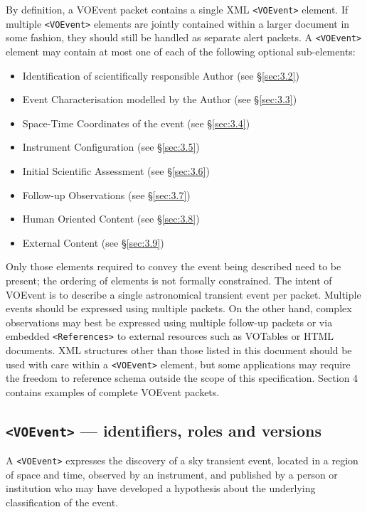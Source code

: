 \documentclass[11pt,a4paper]{ivoa}
\begin{document}
By definition, a VOEvent packet contains a single XML \verb|<VOEvent>| element.
If multiple \verb|<VOEvent>| elements are jointly contained within a larger
document in some fashion, they should still be handled as separate alert
packets. A \verb|<VOEvent>| element may contain at most one of each of the
following optional sub-elements:
\begin{itemize}
\item[\tt <Who>] Identification of scientifically responsible Author (see
\S\ref{sec:3.2})
\item[\tt <What>] Event Characterisation modelled by the Author (see
\S\ref{sec:3.3})
\item[\tt <WhereWhen>] Space-Time Coordinates of the event (see \S\ref{sec:3.4})
\item[\tt <How>] Instrument Configuration (see \S\ref{sec:3.5})
\item[\tt <Why>] Initial Scientific Assessment (see \S\ref{sec:3.6})
\item[\tt <Citations>] Follow-up Observations (see \S\ref{sec:3.7})
\item[\tt <Description>] Human Oriented Content (see \S\ref{sec:3.8})
\item[\tt <Reference>] External Content (see \S\ref{sec:3.9})
\end{itemize}

Only those elements required to convey the event being described need to be
present; the ordering of elements is not formally constrained. The intent of
VOEvent is to describe a single astronomical transient event per packet.
Multiple events should be expressed using multiple packets. On the other hand,
complex observations may best be expressed using multiple follow-up packets or
via embedded \verb|<References>| to external resources such as VOTables or HTML
documents. XML structures other than those listed in this document should be
used with care within a \verb|<VOEvent>| element, but some applications may
require the freedom to reference schema outside the scope of this specification.
Section 4 contains examples of complete VOEvent packets.

\subsection{\texttt{<VOEvent>} --- identifiers, roles and versions}
\label{sec:3.1}
A \verb|<VOEvent>| expresses the discovery of a sky transient event, located in a
region of space and time, observed by an instrument, and published by a person
or institution who may have developed a hypothesis about the underlying
classification of the event.
\end{document}
